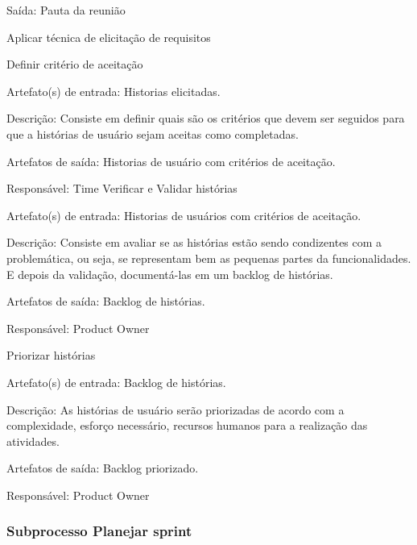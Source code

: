Saída: Pauta da reunião

Aplicar técnica de elicitação de requisitos

Definir critério de aceitação

Artefato(s) de entrada: Historias elicitadas.

Descrição: Consiste em definir quais são os critérios que devem ser seguidos para que a histórias de usuário sejam aceitas como completadas.

Artefatos de saída: Historias de usuário com critérios de aceitação.

Responsável: Time
Verificar e Validar histórias

Artefato(s) de entrada: Historias de usuários com critérios de aceitação.

Descrição: Consiste em avaliar se as histórias estão sendo condizentes com a problemática, ou seja, se representam bem as pequenas partes da funcionalidades. E depois da validação, documentá-las em um backlog de histórias.

Artefatos de saída: Backlog de histórias.

Responsável: Product Owner

Priorizar histórias

Artefato(s) de entrada: Backlog de histórias.

Descrição: As histórias de usuário serão priorizadas de acordo com a complexidade, esforço necessário, recursos humanos para a realização das atividades.

Artefatos de saída: Backlog priorizado.

Responsável: Product Owner

\subsubsection{Subprocesso Planejar sprint}

